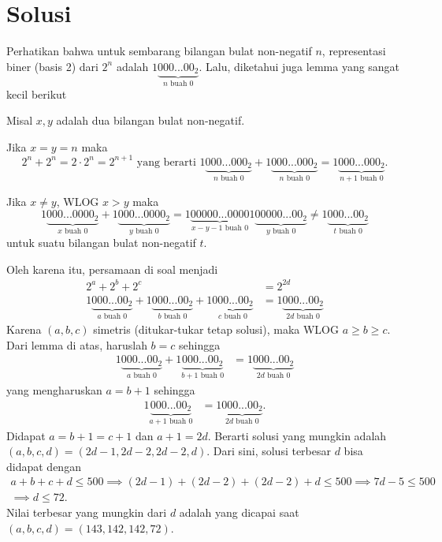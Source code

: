 \section{Solusi}
Perhatikan bahwa untuk sembarang bilangan bulat non-negatif $n$, representasi biner (basis 2) dari $2^n$ adalah $1\underbrace{000...00_2}_{n \text{ buah } 0}$. Lalu, diketahui juga lemma yang sangat kecil berikut 
\begin{lemma*}
    Misal $x,y$ adalah dua bilangan bulat non-negatif.
    
    Jika $x=y=n$ maka
    $$2^n + 2^n = 2 \cdot 2^n = 2^{n+1} \text{ yang berarti } 1\underbrace{000...000_2}_{n \text{ buah } 0} + 1\underbrace{000...000_2}_{n \text{ buah } 0} = 1\underbrace{000...000_2}_{n+1 \text{ buah } 0}.$$
    
    Jika $x \neq y$, WLOG $x > y$ maka 
    $$1\underbrace{000...0000_2}_{x \text{ buah } 0} + 1\underbrace{000...0000_2}_{y \text{ buah } 0} = 1\underbrace{00000...0000}_{x-y-1 \text{ buah } 0}1\underbrace{00000...00_2}_{y \text{ buah } 0} \neq 1\underbrace{000...00_2}_{t \text{ buah } 0}$$
    untuk suatu bilangan bulat non-negatif $t$.
    
\end{lemma*}
Oleh karena itu, persamaan di soal menjadi
\begin{align*}
2^a+2^b+2^c &= 2^{2d}\\
1\underbrace{000...00_2}_{a \text{ buah } 0} + 1\underbrace{000...00_2}_{b \text{ buah } 0} + 1\underbrace{000...00_2}_{c \text{ buah } 0} &= 1\underbrace{000...00_2}_{2d \text{ buah } 0}
\end{align*}
Karena $(a,b,c)$ simetris (ditukar-tukar tetap solusi), maka WLOG $a \ge b \ge c$. Dari lemma di atas, haruslah $b=c$ sehingga
\begin{align*}
1\underbrace{000...00_2}_{a \text{ buah } 0} + 1\underbrace{000...00_2}_{b+1 \text{ buah } 0} &= 1\underbrace{000...00_2}_{2d \text{ buah } 0}
\end{align*}
yang mengharuskan $a=b+1$ sehingga
\begin{align*}
1\underbrace{000...00_2}_{a+1 \text{ buah } 0} &= 1\underbrace{000...00_2}_{2d \text{ buah } 0}.
\end{align*}
Didapat $a=b+1=c+1$ dan $a+1=2d$.
Berarti solusi yang mungkin adalah $(a,b,c,d)=(2d-1, 2d-2, 2d-2, d)$. Dari sini, solusi terbesar $d$ bisa didapat dengan
\begin{align*}
    a+b+c+d \le 500 \implies (2d-1)+(2d-2)+ (2d-2) + d \le 500 \implies 7d - 5 \le 500\\ \implies d \le 72.
\end{align*}
Nilai terbesar yang mungkin dari $d$ adalah  yang dicapai saat\\ $(a,b,c,d)=(143,142,142,72)$.


